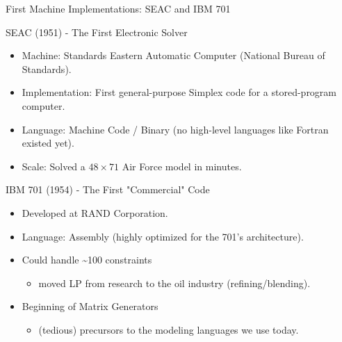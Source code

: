 \documentclass[presentation, aspectratio=169]{beamer}
\begin{document}
\begin{frame}[label={sec:org8d94fb6}]{First Machine Implementations: SEAC and IBM 701}
\begin{block}{SEAC (1951) - The First Electronic Solver}
\begin{itemize}
\item \alert{\alert{Machine}}: Standards Eastern Automatic Computer (National Bureau of Standards).
\item \alert{\alert{Implementation}}: First general-purpose Simplex code for a stored-program computer.
\item \alert{\alert{Language}}: \alert{\alert{Machine Code / Binary}} (no high-level languages like Fortran existed yet).
\item \alert{\alert{Scale}}: Solved a \(48 \times 71\) Air Force model in minutes.
\end{itemize}
\end{block}

\begin{block}{IBM 701 (1954) - The First "Commercial" Code}
\begin{itemize}
\item Developed at RAND Corporation.
\item Language: \alert{\alert{Assembly}} (highly optimized for the 701's architecture).
\item Could handle \textasciitilde{}100 constraints
\begin{itemize}
\item moved LP from research to the oil industry (refining/blending).
\end{itemize}
\item Beginning of \alert{\alert{Matrix Generators}}
\begin{itemize}
\item (tedious) precursors to the modeling languages we use today.
\end{itemize}
\end{itemize}
\end{block}
\end{frame}
\end{document}
